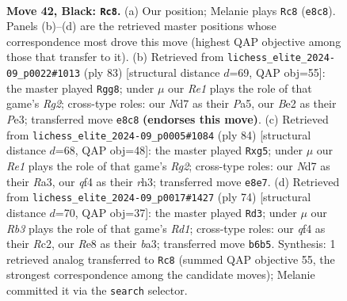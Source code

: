 \documentclass[11pt]{article}
\begin{document}
\clearpage

\begin{figure}[p]\centering
\begin{subfigure}{0.46\textwidth}\centering
\resizebox{\linewidth}{!}{%
\newchessgame
\chessboard[
  setfen={1k2r3/1p1n4/1r1p4/R7/1P2PQ2/2R5/K3b1PP/8 b - - 0 42},
  showmover=false,
  pgfstyle=straightmove, color=movearrow, markmove={e8-c8}
]}
\caption{}
\end{subfigure}\hfill
\begin{subfigure}{0.46\textwidth}\centering
\resizebox{\linewidth}{!}{%
\newchessgame
\chessboard[
  setfen={1r5k/3P1prp/8/p3P2Q/8/4p1PK/1R5P/8 b - - 0 42},
  showmover=false,
  pgfstyle=straightmove, color=movearrow, markmove={g7-g8}
]}
\caption{}
\end{subfigure}
\\[4pt]
\begin{subfigure}{0.46\textwidth}\centering
\resizebox{\linewidth}{!}{%
\newchessgame
\chessboard[
  setfen={8/2p5/2k5/p1p3pp/Pr6/R4P1r/K5R1/8 w - - 0 43},
  showmover=false,
  pgfstyle=straightmove, color=movearrow, markmove={g2-g5}
]}
\caption{}
\end{subfigure}\hfill
\begin{subfigure}{0.46\textwidth}\centering
\resizebox{\linewidth}{!}{%
\newchessgame
\chessboard[
  setfen={3r4/2rP1pk1/8/p3PBp1/8/b1p3P1/2R3K1/3R4 w - - 0 38},
  showmover=false,
  pgfstyle=straightmove, color=movearrow, markmove={d1-d3}
]}
\caption{}
\end{subfigure}
\caption{\textbf{Move 42, Black: \texttt{Rc8}.} (a) Our position; Melanie plays \texttt{Rc8} (\texttt{e8c8}). Panels (b)--(d) are the retrieved master positions whose correspondence most drove this move (highest QAP objective among those that transfer to it). (b) Retrieved from \texttt{lichess\_elite\_2024-09\_p0022\#1013} (ply 83) [structural distance $d$=69, QAP obj=55]: the master played \texttt{Rgg8}; under $\mu$ our \emph{Re1} plays the role of that game's \emph{Rg2}; cross-type roles: our \emph{N}d7 as their \emph{P}a5, our \emph{B}e2 as their \emph{P}e3; transferred move \texttt{e8c8} \textbf{(endorses this move)}. (c) Retrieved from \texttt{lichess\_elite\_2024-09\_p0005\#1084} (ply 84) [structural distance $d$=68, QAP obj=48]: the master played \texttt{Rxg5}; under $\mu$ our \emph{Re1} plays the role of that game's \emph{Rg2}; cross-type roles: our \emph{N}d7 as their \emph{R}a3, our \emph{q}f4 as their \emph{r}h3; transferred move \texttt{e8e7}. (d) Retrieved from \texttt{lichess\_elite\_2024-09\_p0017\#1427} (ply 74) [structural distance $d$=70, QAP obj=37]: the master played \texttt{Rd3}; under $\mu$ our \emph{Rb3} plays the role of that game's \emph{Rd1}; cross-type roles: our \emph{q}f4 as their \emph{R}c2, our \emph{R}e8 as their \emph{b}a3; transferred move \texttt{b6b5}. Synthesis: 1 retrieved analog transferred to \texttt{Rc8} (summed QAP objective 55, the strongest correspondence among the candidate moves); Melanie committed it via the \texttt{search} selector.}
\label{fig:thought-m83}
\end{figure}
\end{document}
